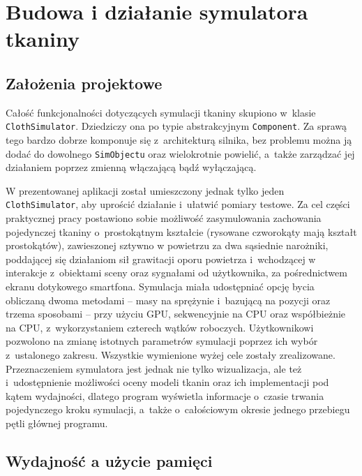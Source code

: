 \chapter{Budowa i działanie symulatora tkaniny}
\label{t:symulacja}

	\section{Założenia projektowe}
	\label{t:symulacja:zalozenia}
	
	
	Całość funkcjonalności dotyczących symulacji tkaniny skupiono w~klasie \texttt{ClothSimulator}. Dziedziczy ona po typie abstrakcyjnym \texttt{Component}. Za sprawą tego bardzo dobrze komponuje się z~architekturą silnika, bez problemu można ją dodać do dowolnego \texttt{SimObjectu} oraz wielokrotnie powielić, a~także zarządzać jej działaniem poprzez zmienną włączającą bądź wyłączającą.
	
	W prezentowanej aplikacji został umieszczony jednak tylko jeden \texttt{ClothSimulator}, aby uprościć działanie i~ułatwić pomiary testowe. Za cel części praktycznej pracy postawiono sobie możliwość zasymulowania zachowania pojedynczej tkaniny o~prostokątnym kształcie (rysowane czworokąty mają kształt prostokątów), zawieszonej sztywno w powietrzu za dwa sąsiednie narożniki, poddającej się działaniom sił grawitacji oporu powietrza i~wchodzącej w interakcje z~obiektami sceny oraz sygnałami od użytkownika, za pośrednictwem ekranu dotykowego smartfona. Symulacja miała udostępniać opcję bycia obliczaną dwoma metodami -- masy na sprężynie i~bazującą na pozycji oraz trzema sposobami -- przy użyciu GPU, sekwencyjnie na CPU oraz współbieżnie na CPU, z~wykorzystaniem czterech wątków roboczych. Użytkownikowi pozwolono na zmianę istotnych parametrów symulacji poprzez ich wybór z~ustalonego zakresu. Wszystkie wymienione wyżej cele zostały zrealizowane. Przeznaczeniem symulatora jest jednak nie tylko wizualizacja, ale też i~udostępnienie możliwości oceny modeli tkanin oraz ich implementacji pod kątem wydajności, dlatego program wyświetla informacje o~czasie trwania pojedynczego kroku symulacji, a~także o~całościowym okresie jednego przebiegu pętli głównej programu. 
	
	\section{Wydajność a użycie pamięci}
	\label{t:symulacja:wydajnoscpamiec}
	
